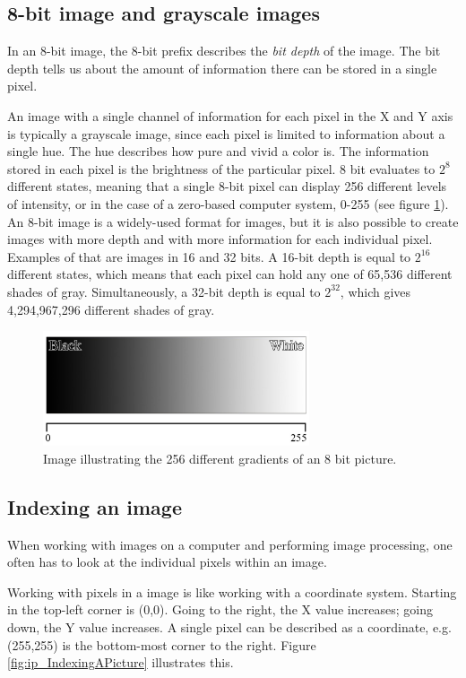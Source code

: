 \subsection{8-bit image and grayscale images}
In an 8-bit image, the 8-bit prefix describes the \textit{bit depth} of the image. The bit depth tells us about the amount of information there can be stored in a single pixel.

An image with a single channel of information for each pixel in the X and Y axis is typically a grayscale image, since each pixel is limited to information about a single hue. The hue describes how pure and vivid a color is. \citep{visual_story} The information stored in each pixel is the brightness of the particular pixel. 8 bit evaluates to $2^8$ different states, meaning that a single 8-bit pixel can display 256 different levels of intensity, or in the case of a zero-based computer system, 0-255 (see figure \ref{fig:ip_grayscale}). An 8-bit image is a widely-used format for images, but it is also possible to create images with more depth and with more information for each individual pixel. Examples of that are images in 16 and 32 bits. A 16-bit depth is equal to $2^{16}$ different states, which means that each pixel can hold any one of 65,536 different shades of gray. Simultaneously, a 32-bit depth is equal to $2^{32}$, which gives 4,294,967,296 different shades of gray.

\begin{figure}[htbp]
\centering
\includegraphics[width=0.7\textwidth]{Pictures/Theory/Grayscale.jpg}
\caption{Image illustrating the 256 different gradients of an 8 bit picture.}
\label{fig:ip_grayscale}
\end{figure}
 
\subsection{Indexing an image}
When working with images on a computer and performing image processing, one often has to look at the individual pixels within an image.

Working with pixels in a image is like working with a coordinate system. Starting in the top-left corner is (0,0). Going to the right, the X value increases; going down, the Y value increases. A single pixel can be described as a coordinate, e.g. (255,255) is the bottom-most corner to the right. Figure \ref{fig:ip_IndexingAPicture} illustrates this.

